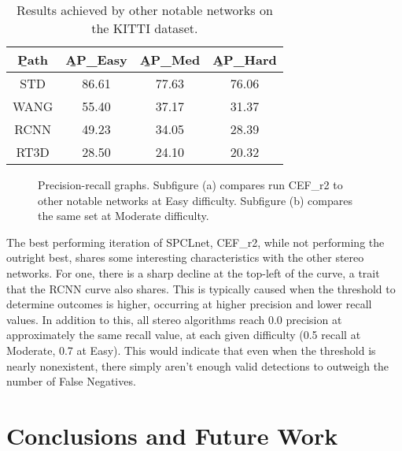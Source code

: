 \begin{table}[ht]
	\centering
	\caption{Results achieved by other notable networks on the KITTI dataset.}
	\begin{tabular}{|c|c|c|c|}
		\hline
		\b{Path} & \b{AP\_Easy} & \b{AP\_Med} & \b{AP\_Hard} \\ \hline
		  STD    &    86.61     &    77.63    &    76.06     \\ \hline
		  WANG   &    55.40     &    37.17    &    31.37     \\ \hline
		  RCNN   &    49.23     &    34.05    &    28.39     \\ \hline
		  RT3D   &    28.50     &    24.10    &    20.32     \\ \hline
	\end{tabular}
	\label{fpnet_ap4}
\end{table}

\begin{figure}[H]
	\centering
	\caption{Precision-recall graphs. Subfigure (a) compares run CEF\_r2 to other notable networks at Easy  difficulty. Subfigure (b) compares the same set at Moderate difficulty.}
	\label{fpnet_pr4}
\end{figure}

The best performing iteration of SPCLnet, CEF\_r2, while not performing the outright best, shares some interesting characteristics with the other stereo networks. For one, there is a sharp decline at the top-left of the curve, a trait that the RCNN curve also shares. This is typically caused when the threshold to determine outcomes is higher, occurring at higher precision and lower recall values. In addition to this, all stereo algorithms reach 0.0 precision at approximately the same recall value, at each given difficulty (0.5 recall at Moderate, 0.7 at Easy). This would indicate that even when the threshold is nearly nonexistent, there simply aren't enough valid detections to outweigh the number of False Negatives. 

\newpage
\section{Conclusions and Future Work}
\label{sect_conclusions}

